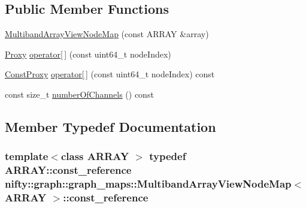 \subsection*{Public Member Functions}
\begin{DoxyCompactItemize}
\item 
\hyperlink{structnifty_1_1graph_1_1graph__maps_1_1MultibandArrayViewNodeMap_a2a111814be7a923efef4ef2ae44394fd}{Multiband\+Array\+View\+Node\+Map} (const A\+R\+R\+A\+Y \&array)
\item 
\hyperlink{classnifty_1_1graph_1_1graph__maps_1_1MultibandArrayViewNodeMap_1_1Proxy}{Proxy} \hyperlink{structnifty_1_1graph_1_1graph__maps_1_1MultibandArrayViewNodeMap_ae68dc0001670dfa50f3b6dd33e8c8bea}{operator\mbox{[}$\,$\mbox{]}} (const uint64\+\_\+t node\+Index)
\item 
\hyperlink{classnifty_1_1graph_1_1graph__maps_1_1MultibandArrayViewNodeMap_1_1ConstProxy}{Const\+Proxy} \hyperlink{structnifty_1_1graph_1_1graph__maps_1_1MultibandArrayViewNodeMap_a0f2dc7564b3ec6607caf481dae9008e7}{operator\mbox{[}$\,$\mbox{]}} (const uint64\+\_\+t node\+Index) const 
\item 
const size\+\_\+t \hyperlink{structnifty_1_1graph_1_1graph__maps_1_1MultibandArrayViewNodeMap_a61fd608ebe01f192ecf3ad6884a342bc}{number\+Of\+Channels} () const 
\end{DoxyCompactItemize}


\subsection{Member Typedef Documentation}
\hypertarget{structnifty_1_1graph_1_1graph__maps_1_1MultibandArrayViewNodeMap_a9a4da5d4bb0e9439af359184b91bc65b}{}
\subsubsection[{const\+\_\+reference}]{\setlength{\rightskip}{0pt plus 5cm}template$<$class A\+R\+R\+A\+Y $>$ typedef A\+R\+R\+A\+Y\+::const\+\_\+reference {\bf nifty\+::graph\+::graph\+\_\+maps\+::\+Multiband\+Array\+View\+Node\+Map}$<$ A\+R\+R\+A\+Y $>$\+::{\bf const\+\_\+reference}}\label{structnifty_1_1graph_1_1graph__maps_1_1MultibandArrayViewNodeMap_a9a4da5d4bb0e9439af359184b91bc65b}
\hypertarget{structnifty_1_1graph_1_1graph__maps_1_1MultibandArrayViewNodeMap_ae8a745152ddc0f45748a17dc130403f6}{}
